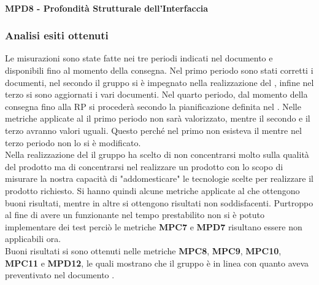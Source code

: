 \paragraph{MPD8 - Profondità Strutturale dell'Interfaccia}
\pgfplotsset{width=16cm, height=8cm}

\subsubsection{Analisi esiti ottenuti}
Le misurazioni sono state fatte nei tre periodi indicati nel documento \PdP{} e disponibili fino al momento della consegna.
Nel primo periodo sono stati corretti i documenti, nel secondo il gruppo \Gruppo{} si è impegnato nella realizzazione del , infine nel terzo si sono aggiornati i vari documenti.
Nel quarto periodo, dal momento della consegna fino alla RP si procederà secondo la pianificazione definita nel \PdP{}.
Nelle metriche applicate al  il primo periodo non sarà valorizzato, mentre il secondo e il terzo avranno valori uguali. Questo perché nel primo non esisteva il  mentre nel terzo periodo non lo si è modificato.\\ 
Nella realizzazione del  il gruppo \Gruppo{} ha scelto di non concentrarsi molto sulla qualità del prodotto ma di concentrarsi nel realizzare un prodotto con lo scopo di misurare la nostra capacità di "addomesticare" le tecnologie scelte per realizzare il prodotto richiesto.
Si hanno quindi alcune metriche applicate al  che ottengono buoni risultati, mentre in altre si ottengono risultati non soddisfacenti.
Purtroppo al fine di avere un  funzionante nel tempo prestabilito non si è potuto implementare dei test perciò le metriche \textbf{MPC7} e \textbf{MPD7} risultano essere non applicabili ora.\\
Buoni risultati si sono ottenuti nelle metriche \textbf{MPC8}, \textbf{MPC9}, \textbf{MPC10}, \textbf{MPC11} e \textbf{MPD12}, le quali mostrano che il gruppo \Gruppo{} è in linea con quanto aveva preventivato nel documento \PdP{}.

